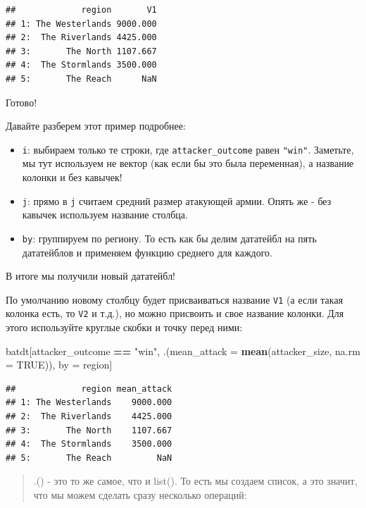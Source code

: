 \documentclass[]{book}
\newenvironment{Shaded}{\begin{snugshade}}{\end{snugshade}}
\newcommand{\KeywordTok}[1]{\textcolor[rgb]{0.13,0.29,0.53}{\textbf{#1}}}
\newcommand{\DataTypeTok}[1]{\textcolor[rgb]{0.13,0.29,0.53}{#1}}
\newcommand{\StringTok}[1]{\textcolor[rgb]{0.31,0.60,0.02}{#1}}
\newcommand{\OtherTok}[1]{\textcolor[rgb]{0.56,0.35,0.01}{#1}}
\newcommand{\OperatorTok}[1]{\textcolor[rgb]{0.81,0.36,0.00}{\textbf{#1}}}
\newcommand{\NormalTok}[1]{#1}
\providecommand{\tightlist}{%
  \setlength{\itemsep}{0pt}\setlength{\parskip}{0pt}}
\begin{document}
\begin{verbatim}
##             region       V1
## 1: The Westerlands 9000.000
## 2:  The Riverlands 4425.000
## 3:       The North 1107.667
## 4:  The Stormlands 3500.000
## 5:       The Reach      NaN
\end{verbatim}

Готово!

Давайте разберем этот пример подробнее:

\begin{itemize}
\tightlist
\item
  \texttt{i}: выбираем только те строки, где \texttt{attacker\_outcome}
  равен \texttt{"win"}. Заметьте, мы тут используем не вектор (как если
  бы это была переменная), а название колонки и без кавычек!
\item
  \texttt{j}: прямо в \texttt{j} считаем средний размер атакующей армии.
  Опять же - без кавычек используем название столбца.
\item
  \texttt{by}: группируем по региону. То есть как бы делим дататейбл на
  пять дататейблов и применяем функцию среднего для каждого.
\end{itemize}

В итоге мы получили новый дататейбл!

По умолчанию новому столбцу будет присваиваться название \texttt{V1} (а
если такая колонка есть, то \texttt{V2} и т.д.), но можно присвоить и
свое название колонки. Для этого используйте круглые скобки и точку
перед ними:

\begin{Shaded}
\begin{Highlighting}[]
\NormalTok{batdt[attacker_outcome }\OperatorTok{==}\StringTok{ "win"}\NormalTok{, }
\NormalTok{      .(}\DataTypeTok{mean_attack =} \KeywordTok{mean}\NormalTok{(attacker_size, }\DataTypeTok{na.rm =} \OtherTok{TRUE}\NormalTok{)), }
\NormalTok{      by =}\StringTok{ }\NormalTok{region]}
\end{Highlighting}
\end{Shaded}

\begin{verbatim}
##             region mean_attack
## 1: The Westerlands    9000.000
## 2:  The Riverlands    4425.000
## 3:       The North    1107.667
## 4:  The Stormlands    3500.000
## 5:       The Reach         NaN
\end{verbatim}

\begin{quote}
.() - это то же самое, что и list(). То есть мы создаем список, а это
значит, что мы можем сделать сразу несколько операций:
\end{quote}
\end{document}
